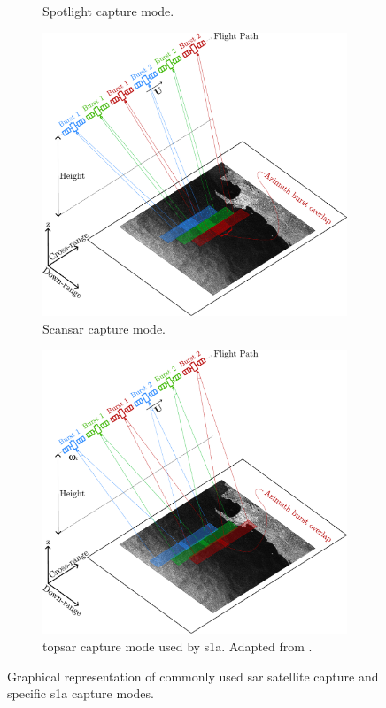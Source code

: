 \begin{figure} [H]
\begin{subfigure}{0.48\textwidth}
        \caption{Spotlight capture mode.}
        \label{fig:theory.spotlight}
    \end{subfigure} 
    \begin{subfigure}{0.48\textwidth}
        \includegraphics[width=\textwidth]{Figures/Theory/scanSAR.pdf}
        \caption{Scan\acs{sar} capture mode.}
        \label{fig:theory.scanSAR}
    \end{subfigure} 
    \begin{subfigure}{0.48\textwidth}
        \includegraphics[width=\textwidth]{Figures/Theory/tops.pdf}
        \caption{\acs{topsar} capture mode used by \acs{s1a}. Adapted from \cite{Huang2014}.}
        \label{fig:theory.tops}
    \end{subfigure}     
    \caption{Graphical representation of commonly used \acs{sar} satellite capture and specific \acs{s1a} capture modes.}
    \label{fig:theory.sarCaptureModes}
\end{figure}


